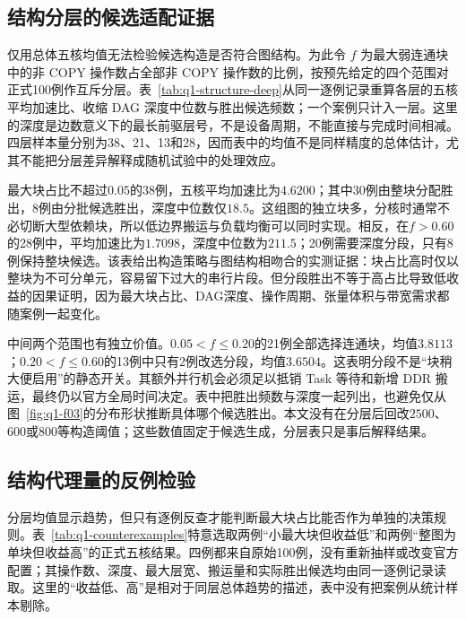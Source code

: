 

\subsection{结构分层的候选适配证据}

仅用总体五核均值无法检验候选构造是否符合图结构。为此令 $f$ 为最大弱连通块中的非 COPY 操作数占全部非 COPY 操作数的比例，按预先给定的四个范围对正式100例作互斥分层。表~\ref{tab:q1-structure-deep}从同一逐例记录重算各层的五核平均加速比、收缩 DAG 深度中位数与胜出候选频数；一个案例只计入一层。这里的深度是边数意义下的最长前驱层号，不是设备周期，不能直接与完成时间相减。四层样本量分别为38、21、13和28，因而表中的均值不是同样精度的总体估计，尤其不能把分层差异解释成随机试验中的处理效应。



最大块占比不超过$0.05$的38例，五核平均加速比为$4.6200$；其中30例由整块分配胜出，8例由分批候选胜出，深度中位数仅$18.5$。这组图的独立块多，分核时通常不必切断大型依赖块，所以低边界搬运与负载均衡可以同时实现。相反，在$f>0.60$的28例中，平均加速比为$1.7098$，深度中位数为$211.5$；20例需要深度分段，只有8例保持整块候选。该表给出构造策略与图结构相吻合的实测证据：块占比高时仅以整块为不可分单元，容易留下过大的串行片段。但分段胜出不等于高占比导致低收益的因果证明，因为最大块占比、DAG深度、操作周期、张量体积与带宽需求都随案例一起变化。

中间两个范围也有独立价值。$0.05<f\leq0.20$的21例全部选择连通块，均值$3.8113$；$0.20<f\leq0.60$的13例中只有2例改选分段，均值$3.6504$。这表明分段不是“块稍大便启用”的静态开关。其额外并行机会必须足以抵销 Task 等待和新增 DDR 搬运，最终仍以官方全局时间决定。表中把胜出频数与深度一起列出，也避免仅从图~\ref{fig:q1-f03}的分布形状推断具体哪个候选胜出。本文没有在分层后回改$2500$、$600$或$800$等构造阈值；这些数值固定于候选生成，分层表只是事后解释结果。

\subsection{结构代理量的反例检验}

分层均值显示趋势，但只有逐例反查才能判断最大块占比能否作为单独的决策规则。表~\ref{tab:q1-counterexamples}特意选取两例“小最大块但收益低”和两例“整图为单块但收益高”的正式五核结果。四例都来自原始100例，没有重新抽样或改变官方配置；其操作数、深度、最大层宽、搬运量和实际胜出候选均由同一逐例记录读取。这里的“收益低、高”是相对于同层总体趋势的描述，表中没有把案例从统计样本剔除。


